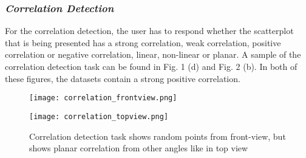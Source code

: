 \documentclass[journal]{vgtc}                %
\begin{document}
\subsubsection{\textit{Correlation Detection}}
For the correlation detection, the user has to respond whether the scatterplot that is being presented has a strong correlation, weak correlation, positive correlation or negative correlation, linear, non-linear or planar. A sample of the correlation detection task can be found in Fig. 1 (d) and Fig. 2 (b). In both of these figures, the datasets contain a strong positive correlation.

\begin{figure}[ht]
    \begin{minipage}[b]{0.45\linewidth}
        \centering
        \texttt{[image: correlation\_frontview.png]}
    \end{minipage}
    \hspace{0.5cm}
    \begin{minipage}[b]{0.45\linewidth}
        \centering
        \texttt{[image: correlation\_topview.png]}
    \end{minipage}
    \caption{Correlation detection task shows random points from front-view, but shows planar correlation from other angles like in top view}
\end{figure}


 
\end{document}
